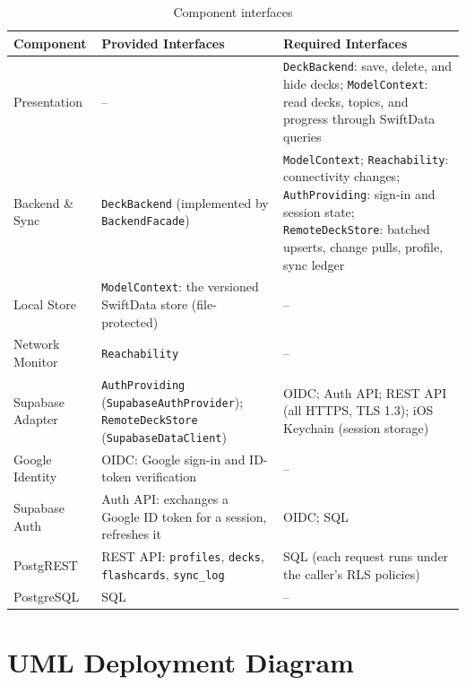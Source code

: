 \documentclass[12pt,letterpaper]{article}
\begin{document}
\begin{table}[H]
\centering
\caption{Component interfaces}
\label{tab:interfaces}
\begin{tabularx}{\textwidth}{@{}L{2.8cm} Y Y@{}}
\toprule
\textbf{Component} & \textbf{Provided Interfaces} & \textbf{Required Interfaces} \\
\midrule
Presentation & -- & \texttt{DeckBackend}: save, delete, and hide decks; \texttt{ModelContext}: read decks, topics, and progress through SwiftData queries \\
Backend \& Sync & \texttt{DeckBackend} (implemented by \texttt{BackendFacade}) & \texttt{ModelContext}; \texttt{Reachability}: connectivity changes; \texttt{AuthProviding}: sign-in and session state; \texttt{RemoteDeckStore}: batched upserts, change pulls, profile, sync ledger \\
Local Store & \texttt{ModelContext}: the versioned SwiftData store (file-protected) & -- \\
Network Monitor & \texttt{Reachability} & -- \\
Supabase Adapter & \texttt{AuthProviding} (\texttt{SupabaseAuthProvider}); \texttt{RemoteDeckStore} (\texttt{SupabaseDataClient}) & OIDC; Auth API; REST API (all HTTPS, TLS 1.3); iOS Keychain (session storage) \\
Google Identity & OIDC: Google sign-in and ID-token verification & -- \\
Supabase Auth & Auth API: exchanges a Google ID token for a session, refreshes it & OIDC; SQL \\
PostgREST & REST API: \texttt{profiles}, \texttt{decks}, \texttt{flashcards}, \texttt{sync\_log} & SQL (each request runs under the caller's RLS policies) \\
PostgreSQL & SQL & -- \\
\bottomrule
\end{tabularx}
\end{table}

\section{UML Deployment Diagram}\label{sec:deploy}
\end{document}
